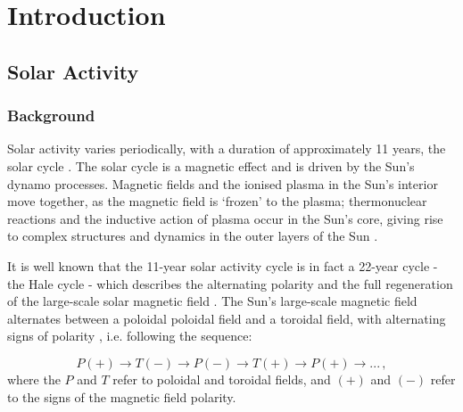 \chapter{Introduction}\label{chap:intro}




\section{Solar Activity}\label{sec:intro_activity}

\subsection{Background}

Solar activity varies periodically, with a duration of approximately 11 years, the solar cycle \citep{hathaway_solar_2015}. The solar cycle is a magnetic effect and is driven by the Sun's dynamo processes. Magnetic fields and the ionised plasma in the Sun's interior move together, as the magnetic field is `frozen' to the plasma; thermonuclear reactions and the inductive action of plasma occur in the Sun's core, giving rise to complex structures and dynamics in the outer layers of the Sun \citep{charbonneau_dynamo_2020}.

It is well known that the 11-year solar activity cycle is in fact a 22-year cycle - the Hale cycle - which describes the alternating polarity and the full regeneration of the large-scale solar magnetic field \citep{hathaway_solar_2015, charbonneau_dynamo_2020}. The Sun's large-scale magnetic field alternates between a poloidal poloidal field and a toroidal field, with alternating signs of polarity \citep{charbonneau_dynamo_2020}, i.e. following the sequence:

\begin{equation}
P(+) \rightarrow T(-) \rightarrow P(-) \rightarrow T(+) \rightarrow P(+) \rightarrow ... \, ,
\label{eq:solar_cycle_dynamo}
\end{equation}
%
where the $P$ and $T$ refer to poloidal and toroidal fields, and $(+)$ and $(-)$ refer to the signs of the magnetic field polarity.

